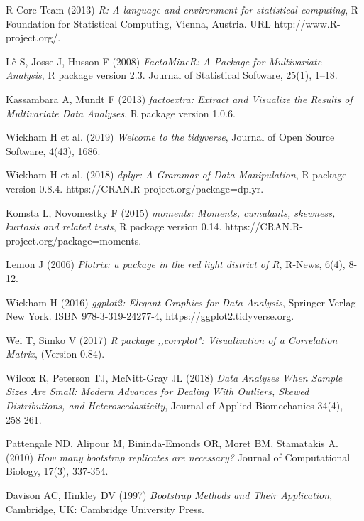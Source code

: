 \documentclass[12pt,a4paper,notitlepage]{report}
\begin{document}
\begin{thebibliography}{26}
 R Core Team (2013) \emph{R: A language and environment for statistical computing}, R Foundation for Statistical Computing, Vienna, Austria. URL http://www.R-project.org/.

 L\^e S, Josse J, Husson F (2008) \emph{FactoMineR: A Package for Multivariate Analysis}, R package version 2.3. Journal of Statistical Software, 25(1), 1–18.

 Kassambara A, Mundt F (2013) \emph{factoextra: Extract and Visualize the Results of Multivariate Data Analyses}, R package version 1.0.6.

 Wickham H et al. (2019) \emph{Welcome to the tidyverse}, Journal of Open Source Software, 4(43), 1686.

 Wickham H et al. (2018) \emph{dplyr: A Grammar of Data Manipulation}, R package version 0.8.4. https://CRAN.R-project.org/package=dplyr.

 Komsta L, Novomestky F (2015) \emph{moments: Moments, cumulants, skewness, kurtosis and related tests},  R package version 0.14. https://CRAN.R-project.org/package=moments.

 Lemon J (2006) \emph{Plotrix: a package in the red light district of R}, R-News, 6(4), 8-12. 

 Wickham H (2016) \emph{ggplot2: Elegant Graphics for Data Analysis}, Springer-Verlag New York. ISBN 978-3-319-24277-4, https://ggplot2.tidyverse.org. 

 Wei T, Simko V (2017) \emph{R package ,,corrplot": Visualization of a Correlation Matrix}, (Version 0.84).

 Wilcox R, Peterson TJ, McNitt-Gray JL (2018) \emph{Data Analyses When Sample Sizes Are Small: Modern Advances for Dealing With Outliers, Skewed Distributions, and Heteroscedasticity}, Journal of Applied Biomechanics 34(4), 258-261.

 Pattengale ND, Alipour M, Bininda-Emonds OR, Moret BM, Stamatakis A. (2010) \emph{How many bootstrap replicates are necessary?} Journal of Computational Biology, 17(3), 337‐354.

 Davison AC, Hinkley DV (1997) \emph{Bootstrap Methods and Their Application}, Cambridge, UK: Cambridge University Press.




\end{thebibliography}
\end{document}
